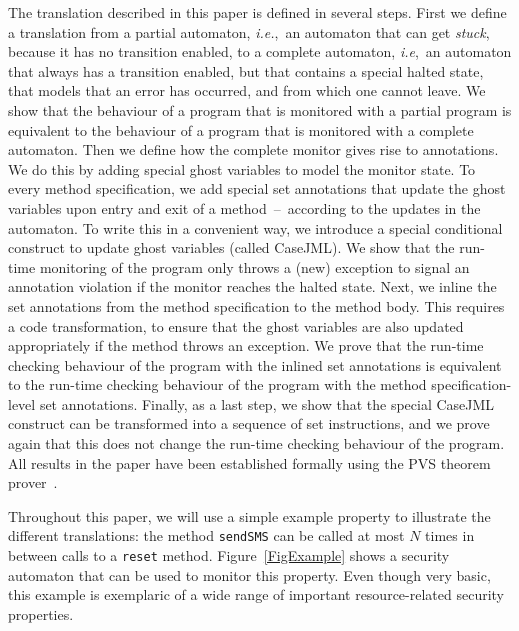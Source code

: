 The translation described in this paper is defined in several
steps. First we define a translation from a partial automaton,
\emph{i.e.},\ an automaton that can get \emph{stuck}, because it has
no transition enabled, to a complete automaton, \emph{i.e},\ an
automaton that always has a transition enabled, but that contains a
special \textsf{halted} state, that models that an error has occurred,
and from which one cannot leave. We show that the behaviour of a
program that is monitored with a partial program is equivalent to the
behaviour of a program that is monitored with a complete
automaton. Then we define how the complete monitor gives rise to
annotations. We do this by adding special ghost variables to model the
monitor state. To every method specification, we add special
\textsf{set} annotations that update the ghost variables upon entry
and exit of a method~--~according to the updates in the automaton. To
write  this in a convenient way, we introduce a special
conditional construct to update ghost variables (called
\textsf{CaseJML}). We show that the run-time monitoring of the program
only throws a (new) exception to signal an annotation violation if the
monitor reaches the \textsf{halted} state. Next, we inline the
\textsf{set} annotations from the method specification to the method
body. This requires a code transformation, to ensure that the ghost
variables are also updated appropriately if the method throws an
exception. We prove that the run-time checking behaviour of the
program with the inlined \textsf{set} annotations is equivalent to the
run-time checking behaviour of the program with the method
specification-level \textsf{set} annotations. Finally, as a last step,
we show that the special \textsf{CaseJML} construct can be transformed
into a sequence of set instructions, and we prove again that this does
not change the run-time checking behaviour of the program. All results
in the paper have been established formally using the PVS theorem
prover~\cite{OwreRRSS96}. 

Throughout this paper, we will use a simple example property to
illustrate the different translations: the method \texttt{sendSMS} can
be called at most \(N\) times in between calls to a \texttt{reset}
method. Figure~\ref{FigExample} shows a security automaton that can be
used to monitor this property. Even though very basic, this example is
exemplaric of a wide range of important resource-related security properties.



